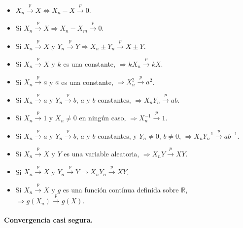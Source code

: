 \documentclass[oneside,spanish,a4paper]{article}
\begin{document}
\begin{itemize}
\item $X_n\overset{p}{\to}X\Leftrightarrow X_n-X\overset{p}{\to}0$.
\item Si $X_n\overset{p}{\to}X\Rightarrow  X_n-X_m\overset{p}{\to}0$.
\item Si $X_n\overset{p}{\to}X$ y $Y_n\overset{p}{\to}Y\Rightarrow X_n\pm Y_n\overset{p}{\to}X\pm Y$.
\item Si $X_n\overset{p}{\to}X$ y $k$ es una constante, $\Rightarrow kX_n\overset{p}{\to}kX$.\item Si $X_n\overset{p}{\to}a$ y $a$ es una constante, $\Rightarrow X_n^2\overset{p}{\to}a^2$.
\item Si $X_n\overset{p}{\to}a$ y $Y_n\overset{p}{\to}b$, $a$ y $b$ constantes, $\Rightarrow X_nY_n\overset{p}{\to}ab$.
\item Si $X_n\overset{p}{\to}1$ y $X_n\neq0$ en ning\'un caso, $\Rightarrow X_n^{-1}\overset{p}{\to}1$.
\item Si $X_n\overset{p}{\to}a$ y $Y_n\overset{p}{\to}b$, $a$ y $b$ constantes, y $Y_n\neq0$, $b\neq0$, $\Rightarrow X_nY_n^{-1}\overset{p}{\to}ab^{-1}$.
\item Si $X_n\overset{p}{\to}X$ y $Y$ es una variable aleatoria, $\Rightarrow X_nY\overset{p}{\to}XY$.
\item Si $X_n\overset{p}{\to}X$ y $Y_n\overset{p}{\to}Y\Rightarrow X_nY_n\overset{p}{\to}XY$.
\item Si $X_n\overset{p}{\to}X$ y $g$ es una funci\'on cont\'inua definida sobre $\mathbb{R}$, $\Rightarrow g(X_n)\overset{p}{\to}g(X)$.
\end{itemize}

\paragraph{Convergencia casi segura.}
\end{document}
